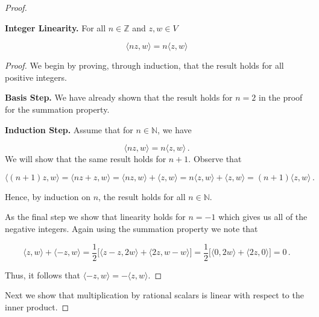 \documentclass[a4paper]{article}
\numberwithin{equation}{section}
\begin{document}
\begin{description}
\begin{proof}
\begin{description}
\item \textbf{Integer Linearity.} For all $n \in \mathbb{Z}$ and $z,w \in V$

$$\langle nz,w \rangle = n\langle z,w \rangle$$

\begin{proof} We begin by proving, through induction, that the result holds for all positive integers. 

	
\begin{description}

	\item \textbf{Basis Step.} We have already shown that the result holds for $n=2$ in the proof for the summation property.
	
	\item \textbf{Induction Step.} Assume that for $n \in \mathbb{N}$, we have
	
	$$\langle nz,w \rangle = n\langle z,w \rangle\,.$$ 
	We will show that the same result holds for $n+1$. Observe that
	
	$$\langle (n+1)z,w \rangle = \langle nz+z,w \rangle = \langle nz,w \rangle + \langle z,w \rangle = n\langle z,w \rangle + \langle z,w \rangle = (n+1)\langle z,w \rangle\,.$$
	
	Hence, by induction on $n$, the result holds for all $n \in \mathbb{N}$.
	
\end{description}

	
As the final step we show that linearity holds for $n = -1$ which gives us all of the negative integers. Again using the summation property we note that

$$\langle z ,w \rangle + \langle -z,w \rangle = \frac{1}{2}\big[\langle z-z,2w \rangle + \langle 2z,w-w \rangle\big] = \frac{1}{2}\big[\langle 0,2w \rangle + \langle 2z,0 \rangle\big] = 0\,.$$

Thus, it follows that $\langle -z,w \rangle = -\langle z,w \rangle$.

\end{proof}

\end{description}


Next we show that multiplication by rational scalars is linear with respect to the inner product. 



\end{proof}
\end{description}
\end{document}

